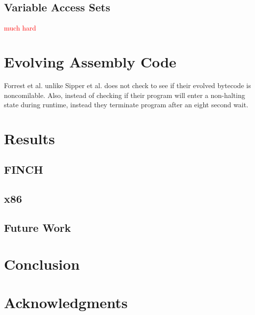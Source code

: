 \documentclass{sig-alternate}
\newcommand{\mycomment}[1]{\textcolor{red}{#1}}
\begin{document}
\subsection{Variable Access Sets}
\cite{FINCH2:2009} \mycomment{much hard}


\section{Evolving Assembly Code}
	Forrest et al.\cite{Assembly:2010} unlike Sipper et al.\cite{FINCH:2011} does not check to see if their evolved bytecode is noncomilable. Also, instead of checking if their program will enter a non-halting state during runtime, instead they terminate program after an eight second wait.



\section{Results}
\subsection{FINCH}
\subsection{x86}

\subsection{Future Work}

\section{Conclusion}


\section{Acknowledgments}


%

%
%
\end{document}
